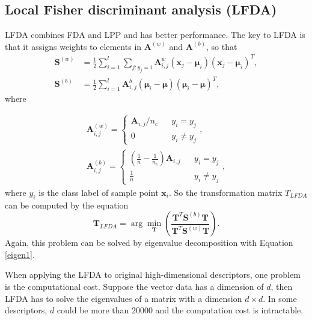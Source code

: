 \subsection{Local Fisher discriminant analysis (LFDA)}
\indent LFDA \cite{LFDA} combines FDA and LPP and has better performance. The key to LFDA is that it assigns weights to elements in $\bm{A}^{(w)}$ and $\bm{A}^{(b)}$, so that
\begin{equation}
\begin{aligned}
\bm{S}^{(w)} &= \frac{1}{2}\sum _{i=1}^l\sum_{j:y_j = i} \bm{A}_{i,j}^w (\bm{x}_j - \bm{\mu}_i)(\bm{x}_j - \bm{\mu}_i)^T,\\
\bm{S}^{(b)} &=  \frac{1}{2}\sum _{i=1}^l \bm{A}_{i,j}^b(\bm{\mu}_i - \bm{\mu})(\bm{\mu}_i - \bm{\mu})^T,
\end{aligned}
\end{equation}
where 

\begin{equation}
\begin{aligned}
\bm{A}_{i,j}^{(w)} = \left \{ 
\begin{array}{rcl}
\bm{A}_{i,j}/n_c &  &y_i = y_j \\
0 & & {y_i \ne y_j }
\end{array}
  \right. , \\
  \bm{A}_{i,j}^{(b)} = \left \{ 
\begin{array}{rcl}
(\frac{1}{n} - \frac{1}{n_c})  \bm{A}_{i,j} &  &{y_i = y_j }\\
\frac{1}{n} & & {y_i \ne y_j }
\end{array}
  \right. ,
 \end{aligned}
\end{equation}
where $y_i$ is the class label of sample point $\bm{x}_i$. So the transformation matrix $T_{LFDA}$ can be computed by the equation
\begin{equation}\label{eigencompute1} 
\bm{T}_{LFDA}  = \arg\min_{\bm{T}} (\frac{\bm{T}^T\bm{S}^{(b)}\bm{T}}{\bm{T}^T\bm{S}^{(w)}\bm{T}}).
\end{equation}
Again, this problem can be solved by eigenvalue decomposition with Equation \ref{eigen1}. 



When applying the LFDA to original high-dimensional descriptors, one problem is the computational cost. Suppose the vector data has a dimension of $d$, then LFDA has to solve the eigenvalues of a matrix with a dimension $d\times d$. In some descriptors, $d$ could be more than 20000 and the computation cost is intractable. 
 
